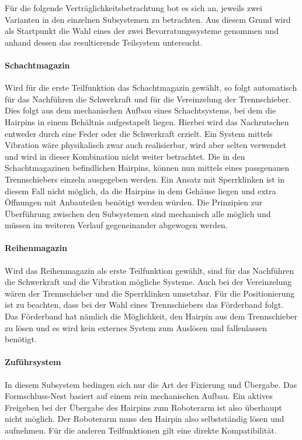 Für die folgende Verträglichkeitsbetrachtung bot es sich an, jeweils zwei Varianten in den einzelnen Subsystemen zu betrachten.
Aus diesem Grund wird als Startpunkt die Wahl eines der zwei Bevorratungssysteme genommen und anhand dessen das resultierende
Teilsystem untersucht.

\paragraph{Schachtmagazin} Wird für die erste Teilfunktion das Schachtmagazin gewählt, so folgt automatisch für das
Nachführen die Schwerkraft und für die Vereinzelung der Trennschieber. Dies folgt aus dem mechanischen Aufbau eines
Schachtsystems, bei dem die Hairpins in einem Behältnis aufgestapelt liegen. Hierbei wird das Nachrutschen entweder
durch eine Feder oder die Schwerkraft erzielt. Ein System mittels Vibration wäre physikalisch zwar auch realisierbar,
wird aber selten verwendet und wird in dieser Kombination nicht weiter betrachtet. Die in den Schachtmagazinen befindlichen
Hairpins, können nun mittels eines passgenauen Trennschiebers einzeln ausgegeben werden. Ein Ansatz mit Sperrklinken ist
in diesem Fall nicht möglich, da die Hairpins in dem Gehäuse liegen und extra Öffnungen mit Anbauteilen benötigt werden würden.
Die Prinzipien zur Überführung zwischen den Subsystemen sind mechanisch alle möglich und müssen im weiteren Verlauf gegeneinander
abgewogen werden.

\paragraph{Reihenmagazin} Wird das Reihenmagazin als erste Teilfunktion gewählt, sind für das Nachführen die Schwerkraft und
die Vibration mögliche Systeme. Auch bei der Vereinzelung wären der Trennschieber und die Sperrklinken umsetzbar. Für die Positionierung
ist zu beachten, dass bei der Wahl eines Trennschiebers das Förderband folgt. Das Förderband hat nämlich die Möglichkeit, den
Hairpin aus dem Trennschieber zu lösen und es wird kein externes System zum Auslösen und fallenlassen benötigt.

\paragraph{Zuführsystem} In diesem Subsystem bedingen sich nur die Art der Fixierung und Übergabe. Das Formschluss-Nest basiert
auf einem rein mechanischen Aufbau. Ein aktives Freigeben bei der Übergabe des Hairpins zum Roboterarm ist also überhaupt nicht
möglich. Der Roboterarm muss den Hairpin also selbstständig lösen und aufnehmen. Für die anderen Teilfunktionen gilt eine direkte
Kompatibilität.
%
%
